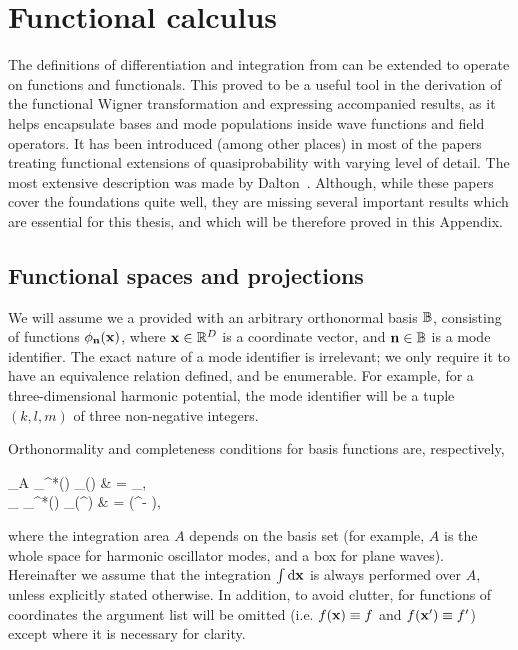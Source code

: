 \chapter{Functional calculus}
\label{cha:appendix:func-calculus}

The definitions of differentiation and integration from  can be extended to operate on functions and functionals.
This proved to be a useful tool in the derivation of the functional Wigner transformation and expressing accompanied results, as it helps encapsulate bases and mode populations inside wave functions and field operators.
It has been introduced (among other places) in most of the papers treating functional extensions of quasiprobability with varying level of detail.
The most extensive description was made by Dalton~\cite{Dalton2011}.
Although, while these papers cover the foundations quite well, they are missing several important results which are essential for this thesis, and which will be therefore proved in this Appendix.


\section{Functional spaces and projections}

We will assume we a provided with an arbitrary orthonormal basis $\mathbb{B}$, consisting of functions $\phi_{\mathbf{n}}(\mathbf{x})$, where $\mathbf{x} \in \mathbb{R}^D$ is a coordinate vector, and $\mathbf{n} \in \mathbb{B}$ is a mode identifier.
The exact nature of a mode identifier is irrelevant; we only require it to have an equivalence relation defined, and be enumerable.
For example, for a three-dimensional harmonic potential, the mode identifier will be a tuple $(k,l,m)$ of three non-negative integers.

Orthonormality and completeness conditions for basis functions are, respectively,
\begin{eqns}
	\int\limits_A \phi_{\nvec}^*(\xvec) \phi_{\mvec}(\xvec) \upd\xvec
	& = \delta_{\nvec\mvec}, \\
	\sum_{\nvec \in \fullbasis} \phi_{\nvec}^*(\xvec) \phi_{\nvec}(\xvec^\prime)
	& = \delta(\xvec^\prime - \xvec),
\end{eqns}
where the integration area $A$ depends on the basis set (for example, $A$ is the whole space for harmonic oscillator modes, and a box for plane waves).
Hereinafter we assume that the integration $\int \mathrm{d}\mathbf{x}$ is always performed over $A$, unless explicitly stated otherwise. In addition, to avoid clutter, for functions of coordinates the argument list will be omitted (i.e. $f(\mathbf{x}) \equiv f$ and $f(\mathbf{x}^\prime) \equiv f^\prime$) except where it is necessary for clarity.

